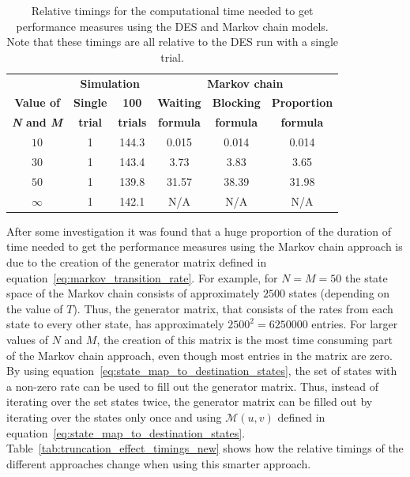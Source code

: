 \tiny
\begin{table}[H]
    \centering
    \caption{Relative timings for the computational time needed to get
    performance measures using the DES and Markov chain models. Note that these
    timings are all relative to the DES run with a single trial.}
    \begin{tabular}{c|cc|ccc}
        & \multicolumn{2}{c}{\textbf{Simulation}} &
        \multicolumn{3}{c}{\textbf{Markov chain}} \\
        \textbf{Value of} & \textbf{Single} & \textbf{100} &
        \textbf{Waiting} & \textbf{Blocking} &
        \textbf{Proportion} \\
        \textbf{\textit{N} and \textit{M}} & \textbf{trial} & \textbf{trials} &
        \textbf{formula} & \textbf{formula} & \textbf{formula} \\
        \hline
        \(10\) & 1 & 144.3 & 0.015  & 0.014  & 0.014 \\
        \hline
        \(30\) & 1 & 143.4 & 3.73   & 3.83   & 3.65 \\
        \hline
        \(50\) & 1 & 139.8 & 31.57  & 38.39  & 31.98 \\
        \hline
        \(\infty\) & 1 & 142.1 & N/A & N/A & N/A \\
    \end{tabular}
    \label{tab:truncation_effect_timings_old}
\end{table}
\normalsize

After some investigation it was found that a huge proportion of the duration of
time needed to get the performance measures using the Markov chain approach is
due to the creation of the generator matrix defined in
equation~\eqref{eq:markov_transition_rate}.
For example, for \(N = M = 50\) the state space of the Markov chain consists
of approximately \(2500\) states (depending on the value of \(T\)).
Thus, the generator matrix, that consists of the rates from each state to every
other state, has approximately \(2500^2 = 6250000\) entries.
For larger values of \(N\) and \(M\), the creation of this matrix is the most
time consuming part of the Markov chain approach, even though most entries in
the matrix are zero.
By using equation~\eqref{eq:state_map_to_destination_states}, the set of states
with a non-zero rate can be used to fill out the generator matrix.
Thus, instead of iterating over the set states twice, the generator matrix can
be filled out by iterating over the states only once and using
\(\mathcal{M}(u,v)\) defined in
equation~\eqref{eq:state_map_to_destination_states}.
Table~\ref{tab:truncation_effect_timings_new} shows how the relative timings
of the different approaches change when using this smarter approach.


